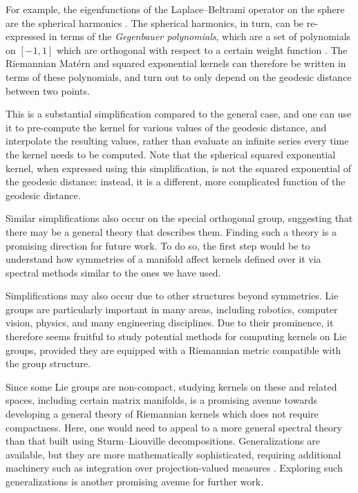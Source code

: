 \documentclass[11pt]{book}
\begin{document}
For example, the eigenfunctions of the Laplace--Beltrami operator on the sphere are the spherical harmonics \cite{chavel84,canzani13}.
The spherical harmonics, in turn, can be re-expressed in terms of the \emph{Gegenbauer polynomials}, which are a set of polynomials on $[-1,1]$ which are orthogonal with respect to a certain weight function \cite{gradshteyn14}.
The Riemannian Matérn and squared exponential kernels can therefore be written in terms of these polynomials, and turn out to only depend on the geodesic distance between two points.

This is a substantial simplification compared to the general case, and one can use it to pre-compute the kernel for various values of the geodesic distance, and interpolate the resulting values, rather than evaluate an infinite series every time the kernel needs to be computed.
Note that the spherical squared exponential kernel, when expressed using this simplification, is not the squared exponential of the geodesic distance: instead, it is a different, more complicated function of the geodesic distance.

Similar simplifications also occur on the special orthogonal group, suggesting that there may be a general theory that describes them.
Finding such a theory is a promising direction for future work.
To do so, the first step would be to understand how symmetries of a manifold affect kernels defined over it via spectral methods similar to the ones we have used.

Simplifications may also occur due to other structures beyond symmetries.
Lie groups are particularly important in many areas, including robotics, computer vision, physics, and many engineering disciplines.
Due to their prominence, it therefore seems fruitful to study potential methods for computing kernels on Lie groups, provided they are equipped with a Riemannian metric compatible with the group structure.

Since some Lie groups are non-compact, studying kernels on these and related spaces, including certain matrix manifolds, is a promising avenue towards developing a general theory of Riemannian kernels which does not require compactness.
Here, one would need to appeal to a more general spectral theory than that built using Sturm--Liouville decompositions.
Generalizations are available, but they are more mathematically sophisticated, requiring additional machinery such as integration over projection-valued measures \cite{lang12}.
Exploring such generalizations is another promising avenue for further work.
\end{document}
